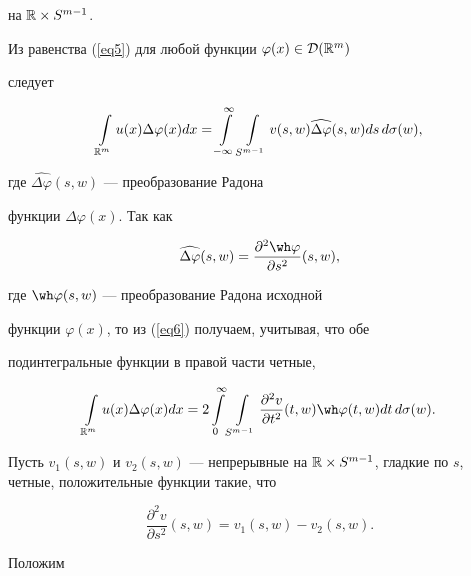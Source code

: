 \begin{pf}
на $\Bbb R\times S^{m-1}$. 


Из равенства (\ref{eq5}) для любой функции $\varphi(x)\in{\cal D}(\Bbb R^m)$


следует


\begin{equation}\label{eq6}


\int\limits_{\BR^m} u(x)\Delta\varphi(x)dx=


\int\limits_{-\infty}^{\infty}\int\limits_{S^{m-1}}


v(s,w)\widehat{\Delta\varphi}(s,w)ds\,d\sigma(w),


\end{equation}


где $\widehat{\Delta\varphi}(s,w)$ --- преобразование Радона


функции $\Delta\varphi(x)$. Так как \cite{Gelfand}


$$


\widehat{\Delta\varphi}(s,w)=\frac{\partial^2\wh\varphi}{\partial s^2}


(s,w),


$$


где $\wh\varphi(s,w)$ --- преобразование Радона исходной


функции $\varphi(x)$, то из (\ref{eq6}) получаем, учитывая, что обе 


подинтегральные функции в правой части четные,


\begin{equation}\label{eq7}


\int\limits_{\BR^m} u(x)\Delta


\varphi(x)dx=2\int\limits_{0}^{\infty}\int\limits_{S^{m-1}}


\frac{\partial^2v}{\partial t^2}(t,w)\wh\varphi(t,w)dt\,d\sigma(w).


\end{equation}





Пусть $v_1(s,w)$ и $v_2(s,w)$ --- непрерывные на $\BR\times


S^{m-1}$, гладкие по $s$, четные, положительные функции такие, что 


\begin{equation}\label{eq8}


\frac{\partial^2v}{\partial s^2}(s,w)=v_1(s,w)-v_2(s,w).


\end{equation}


Положим



\end{pf}
